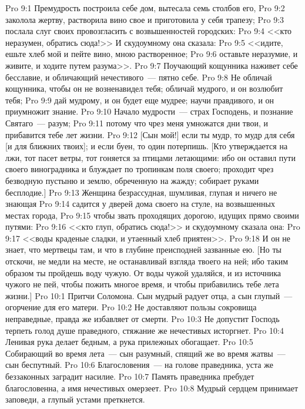 \vs Pro 9:1 Премудрость построила себе дом, вытесала семь столбов его,
\vs Pro 9:2 заколола жертву, растворила вино свое и приготовила у себя трапезу;
\vs Pro 9:3 послала слуг своих провозгласить с возвышенностей городских:
\vs Pro 9:4 <<кто неразумен, обратись сюда!>> И скудоумному она сказала:
\vs Pro 9:5 <<идите, ешьте хлеб мой и пейте вино, мною растворенное;
\vs Pro 9:6 оставьте неразумие, и живите, и ходите путем разума>>.
\vs Pro 9:7 Поучающий кощунника наживет себе бесславие, и обличающий нечестивого~--- пятно себе.
\vs Pro 9:8 Не обличай кощунника, чтобы он не возненавидел тебя; обличай мудрого, и он возлюбит тебя;
\vs Pro 9:9 дай  мудрому, и он будет еще мудрее; научи правдивого, и он приумножит знание.
\vs Pro 9:10 Начало мудрости~--- страх Господень, и познание Святаго~--- разум;
\vs Pro 9:11 потому что чрез меня умножатся дни твои, и прибавится тебе лет жизни.
\vs Pro 9:12 [Сын мой!] если ты мудр, то мудр для себя [и для ближних твоих]; и если буен, то один потерпишь. [Кто утверждается на лжи, тот пасет ветры, тот гоняется за птицами летающими: ибо он оставил пути своего виноградника и блуждает по тропинкам поля своего; проходит чрез безводную пустыню и землю, обреченную на жажду; собирает руками бесплодие.]
\rsbpar\vs Pro 9:13 Женщина безрассудная, шумливая, глупая и ничего не знающая
\vs Pro 9:14 садится у дверей дома своего на стуле, на возвышенных местах города,
\vs Pro 9:15 чтобы звать проходящих дорогою, идущих прямо своими путями:
\vs Pro 9:16 <<кто глуп, обратись сюда!>> и скудоумному сказала она:
\vs Pro 9:17 <<воды краденые сладки, и утаенный хлеб приятен>>.
\vs Pro 9:18 И он не знает, что мертвецы там, и что в глубине преисподней зазванные ею. [Но ты отскочи, не медли на месте, не останавливай взгляда твоего на ней; ибо таким образом ты пройдешь воду чужую. От воды чужой удаляйся, и из источника чужого не пей, чтобы пожить многое время, и чтобы прибавились тебе лета жизни.]
\vs Pro 10:1 Притчи Соломона. Сын мудрый радует отца, а сын глупый~--- огорчение для его матери.
\vs Pro 10:2 Не доставляют пользы сокровища неправедные, правда же избавляет от смерти.
\vs Pro 10:3 Не допустит Господь терпеть голод душе праведного, стяжание же нечестивых исторгнет.
\vs Pro 10:4 Ленивая рука делает бедным, а рука прилежных обогащает.
\vs Pro 10:5 Собирающий во время лета~--- сын разумный, спящий же во время жатвы~--- сын беспутный.
\vs Pro 10:6 Благословения~--- на голове праведника, уста же беззаконных заградит насилие.
\vs Pro 10:7 Память праведника пребудет благословенна, а имя нечестивых омерзеет.
\vs Pro 10:8 Мудрый сердцем принимает заповеди, а глупый устами преткнется.
